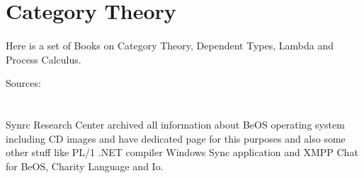 \documentclass[11pt]{article}
\begin{document}
\section*{Category Theory}
\paragraph{}
Here is a set of Books on Category Theory, Dependent Types, Lambda and Process Calculus.

Sources: 

\section*{}
\paragraph{}
Synrc Research Center archived all information about BeOS operating system 
including CD images and have dedicated page for this purposes and also some
other stuff like PL/1 .NET compiler Windows Sync application and XMPP Chat for BeOS, Charity Language and Io.





\end{document}
